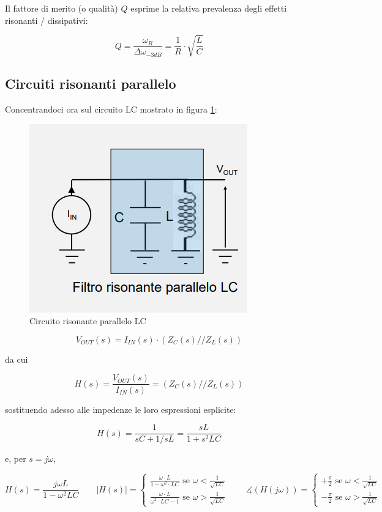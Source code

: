\documentclass{article}
\begin{document}
Il fattore di merito (o qualità) $Q$ esprime la relativa prevalenza degli effetti risonanti / dissipativi:

\[Q = \frac{\omega _R}{\Delta \omega _{-3dB}} = \frac{1}{R} \cdot \sqrt{\frac{L}{C}}\]











\clearpage
\subsection{Circuiti risonanti parallelo}

Concentrandoci ora sul circuito LC mostrato in figura \ref{Schema_circuito_risonante_parallelo_LC}:

\begin{figure}[h]
  \centering
  \includegraphics[scale=0.5]{IM_circuito_risonante_parallelo_LC}
  \caption{Circuito risonante parallelo LC}
  \label{Schema_circuito_risonante_parallelo_LC}
\end{figure}

\[V_{OUT}(s) = I_{IN}(s) \cdot (Z_C(s) // Z_L (s))\]

da cui

\[H(s) = \frac{V_{OUT} (s)}{I_{IN} (s)} = (Z_C(s) // Z_L (s))\]

sostituendo adesso alle impedenze le loro espressioni esplicite:

\[H(s) = \frac{1}{sC + 1/sL} = \frac{sL}{1 + s^2 LC}\]

e, per $s = j\omega$, 

\[H(s) = \frac{j \omega L}{1 - \omega ^2 LC} \quad \quad |H(s)| = \begin{cases} \frac{\omega \cdot L}{1 - \omega ^2 \cdot LC} \textrm{ se } \omega < \frac{1}{\sqrt{LC}} \\ \frac{\omega \cdot L}{\omega ^2 \cdot LC - 1} \textrm{ se } \omega > \frac{1}{\sqrt{LC}} \end{cases} \quad \quad \measuredangle (H(j \omega)) = \begin{cases} + \frac{\pi}{2} \textrm{ se } \omega < \frac{1}{\sqrt{LC}} \\ - \frac{\pi}{2} \textrm{ se } \omega > \frac{1}{\sqrt{LC}} \end{cases}\]
\end{document}
